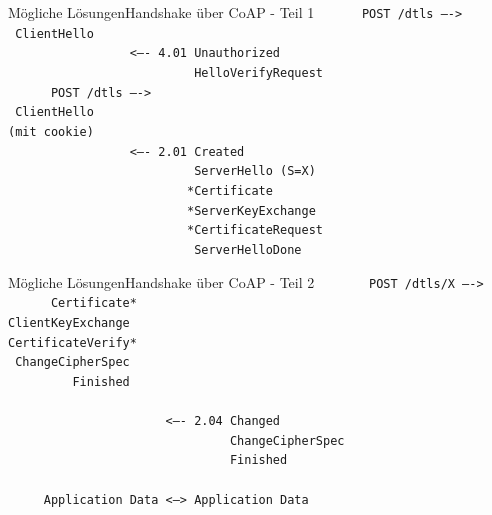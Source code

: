 \documentclass{beamer}
\begin{document}
\begin{frame}{Mögliche Lösungen}{Handshake über CoAP - Teil 1}
  \tt ~~~~~~POST /dtls ---->\\
  \tt ~ClientHello\\
  \tt ~~~~~~~~~~~~~~~~~<---- 4.01 Unauthorized\\
  \tt ~~~~~~~~~~~~~~~~~~~~~~~~~~HelloVerifyRequest\\
  \tt ~~~~~~POST /dtls ---->\\
  \tt ~ClientHello\\
  \tt (mit cookie)\\
  \tt ~~~~~~~~~~~~~~~~~<---- 2.01 Created\\
  \tt ~~~~~~~~~~~~~~~~~~~~~~~~~~ServerHello (S=X)\\
  \tt ~~~~~~~~~~~~~~~~~~~~~~~~~*Certificate\\
  \tt ~~~~~~~~~~~~~~~~~~~~~~~~~*ServerKeyExchange\\
  \tt ~~~~~~~~~~~~~~~~~~~~~~~~~*CertificateRequest\\
  \tt ~~~~~~~~~~~~~~~~~~~~~~~~~~ServerHelloDone
\end{frame}
\begin{frame}{Mögliche Lösungen}{Handshake über CoAP - Teil 2}
  \tt ~~~~~~~POST /dtls/X ---->\\
  \tt ~~~~~~Certificate*\\
  \tt ClientKeyExchange\\
  \tt CertificateVerify*\\
  \tt ~ChangeCipherSpec\\
  \tt ~~~~~~~~~Finished\\
  ~\\
  \tt ~~~~~~~~~~~~~~~~~~~~~~<---- 2.04 Changed\\
  \tt ~~~~~~~~~~~~~~~~~~~~~~~~~~~~~~~ChangeCipherSpec\\
  \tt ~~~~~~~~~~~~~~~~~~~~~~~~~~~~~~~Finished\\
  ~\\
  \tt ~~~~~Application Data <---> Application Data
\end{frame}
\end{document}

